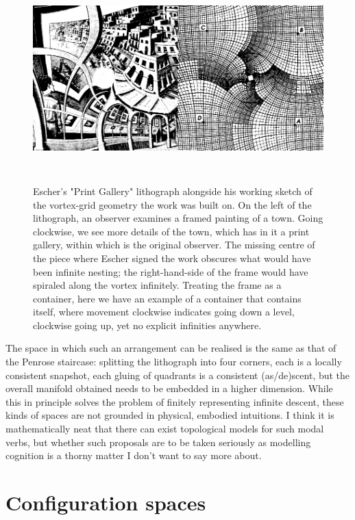 \begin{figure}[h!]
\centering
\includegraphics[height=8cm]{figures/bubbles/combined}
\caption{Escher's "Print Gallery" lithograph alongside his working sketch of the vortex-grid geometry the work was built on. On the left of the lithograph, an observer examines a framed painting of a town. Going clockwise, we see more details of the town, which has in it a print gallery, within which is the original observer. The missing centre of the piece where Escher signed the work obscures what would have been infinite nesting; the right-hand-side of the frame would have spiraled along the vortex infinitely. Treating the frame as a container, here we have an example of a container that contains itself, where movement clockwise indicates going down a level, clockwise going up, yet no explicit infinities anywhere.}
\label{fig:gallery}
\end{figure}

The space in which such an arrangement can be realised is the same as that of the Penrose staircase: splitting the lithograph into four corners, each is a locally consistent snapshot, each gluing of quadrants is a consistent (as/de)scent, but the overall manifold obtained needs to be embedded in a higher dimension. While this in principle solves the problem of finitely representing infinite descent, these kinds of spaces are not grounded in physical, embodied intuitions. I think it is mathematically neat that there can exist topological models for such modal verbs, but whether such proposals are to be taken seriously as modelling cognition is a thorny matter I don't want to say more about.

\newpage
\section{Configuration spaces}

